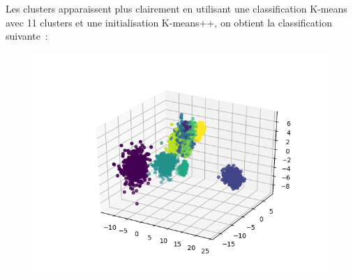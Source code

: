 \documentclass[12pt]{scrartcl} %
\begin{document}
Les clusters apparaissent plus clairement en utilisant une classification K-means avec 11 clusters et une initialisation K-means++, on obtient la classification suivante~:
\newline
\begin{figure}[!h]
 \centering 
\includegraphics[scale=.5]{kmeans_AFD8.png}
\end{figure}
\newline 
\end{document}
